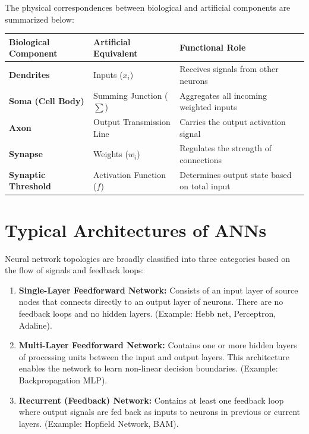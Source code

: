 \documentclass[12pt,a4paper]{article}
\renewcommand{\arraystretch}{1.45}
\begin{document}
\par\noindent
The physical correspondences between biological and artificial components are summarized below:
\par\noindent
{\renewcommand{\arraystretch}{1.9}%
\begin{tabularx}{\linewidth}{|>{\bfseries}B{3.5cm}|Y|Y|}
\hline
Biological Component & Artificial Equivalent & Functional Role \\
\hline
Dendrites & Inputs ($x_i$) & Receives signals from other neurons \\[4pt]
\hline
Soma (Cell Body) & Summing Junction ($\sum$) & Aggregates all incoming weighted inputs \\[6pt]
\hline
Axon & Output Transmission Line & Carries the output activation signal \\
\hline
Synapse & Weights ($w_i$) & Regulates the strength of connections \\[4pt]
\hline
Synaptic Threshold & Activation Function ($f$) & Determines output state based on total input \\
\hline
\end{tabularx}}

\section{Typical Architectures of ANNs}

Neural network topologies are broadly classified into three categories based on the flow of signals and feedback loops:

\begin{enumerate}[leftmargin=*, itemsep=4pt]
  \item \textbf{Single-Layer Feedforward Network:} Consists of an input layer of source nodes that connects directly to an output layer of neurons. There are no feedback loops and no hidden layers. (Example: Hebb net, Perceptron, Adaline).
  \item \textbf{Multi-Layer Feedforward Network:} Contains one or more hidden layers of processing units between the input and output layers. This architecture enables the network to learn non-linear decision boundaries. (Example: Backpropagation MLP).
  \item \textbf{Recurrent (Feedback) Network:} Contains at least one feedback loop where output signals are fed back as inputs to neurons in previous or current layers. (Example: Hopfield Network, BAM).
\end{enumerate}
\end{document}
